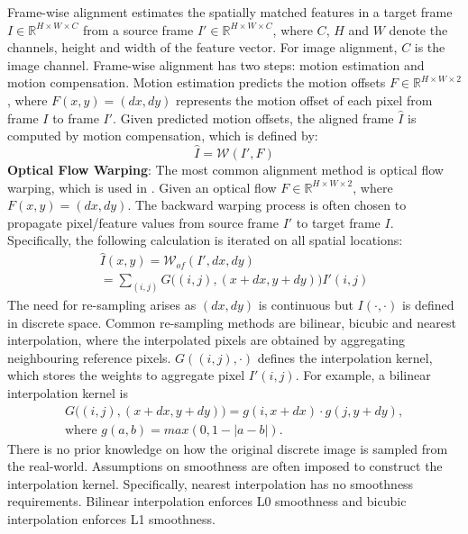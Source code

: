 \documentclass[10pt,twocolumn,letterpaper]{article}
\begin{document}
Frame-wise alignment estimates the spatially matched features in a target frame $I\in \mathbb{R}^{H \times W \times C}$ from a source frame $I'\in \mathbb{R}^{H \times W \times C}$, where $C$, $H$ and $W$ denote the channels, height and width of the feature vector. For image alignment, $C$ is the image channel. 
Frame-wise alignment has two steps: motion estimation and motion compensation. 
Motion estimation predicts the motion offsets $F\in \mathbb{R}^{H \times W \times 2}$, where $F(x,y)=(dx,dy)$ represents the motion offset of each pixel from frame $I$ to frame $I'$. Given predicted motion offsets, the aligned frame $\hat{I}$ is computed by motion compensation, which is defined by:
\begin{equation}\label{eq:alignment}
    \hat{I} = \mathcal{W}(I', F)
\end{equation}
\noindent\textbf{Optical Flow Warping}:
The most common alignment method is optical flow warping, which is used in \cite{chan2021basicvsr,xue2019video_tof,lin2022unsupervised_S2SVR}. Given an optical flow $F\in \mathbb{R}^{H \times W \times 2}$, where $F(x,y)=(dx,dy)$.  The backward warping process is often chosen to propagate pixel/feature values from source frame $I'$ to target frame $I$. Specifically, the following calculation is iterated on all spatial locations:
\begin{multline}\label{eq:of_warping}
\hat{I}(x,y)=\mathcal{W}_{of}(I',dx,dy)\\
=\sum_{(i,j)}G\big((i,j), (x+dx,y+dy)\big)I'(i,j)
\end{multline}
The need for re-sampling arises as $(dx,dy)$ is continuous but $I(\cdot,\cdot)$ is defined in discrete space. Common re-sampling methods are bilinear, bicubic and nearest interpolation, where the interpolated pixels are obtained by aggregating neighbouring reference pixels. $G((i,j), \cdot)$ defines the interpolation kernel, which stores the weights to aggregate pixel $I'(i,j)$. For example, a bilinear interpolation kernel is
\begin{multline} \label{eq:bilinear_interpolation_kernel}
    G\big((i,j),(x+dx,y+dy)\big)=g(i,x+dx)\cdot g(j,y+dy), \\
    \text{where }g(a,b)=max(0,1-|a-b|).
\end{multline}
There is no prior knowledge on how the original discrete image is sampled from the real-world. Assumptions on smoothness are often imposed to construct the interpolation kernel. Specifically, nearest interpolation has no smoothness requirements.  Bilinear interpolation enforces L0 smoothness and bicubic interpolation enforces L1 smoothness. 
\end{document}
